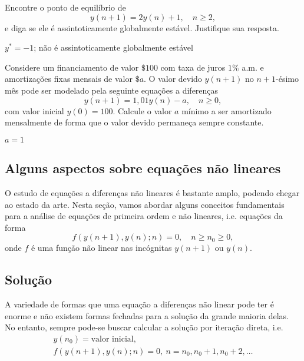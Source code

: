 \begin{exer}
  Encontre o ponto de equilíbrio de
  \begin{equation}
    y(n+1) = 2y(n) + 1,\quad n\geq 2,
  \end{equation}
  e diga se ele é assintoticamente globalmente estável. Justifique sua resposta.
\end{exer}
\begin{resp}
  $y^*=-1$; não é assintoticamente globalmente estável
\end{resp}

\begin{exer}
  Considere um financiamento de valor $\$ 100$ com taxa de juros $1\%$ a.m. e amortizações fixas mensais de valor $\$ a$. O valor devido $y(n+1)$ no $n+1$-ésimo mês pode ser modelado pela seguinte equações a diferenças
  \begin{equation}
    y(n+1) = 1,01y(n)-a,\quad n\geq 0,
  \end{equation}
  com valor inicial $y(0)=100$. Calcule o valor $a$ mínimo a ser amortizado mensalmente de forma que o valor devido permaneça sempre constante.
\end{exer}
\begin{resp}
  $a=1$
\end{resp}

\subsection{Alguns aspectos sobre equações não lineares}

O estudo de equações a diferenças não lineares é bastante amplo, podendo chegar ao estado da arte. Nesta seção, vamos abordar alguns conceitos fundamentais para a análise de equações de primeira ordem e não lineares, i.e. equações da forma
\begin{equation}\label{eq:ead1_enl}
  f\left(y(n+1),y(n);n\right)=0,\quad n\geq n_0\geq 0,
\end{equation}
onde $f$ é uma função não linear nas incógnitas $y(n+1)$ ou $y(n)$.

\subsection{Solução}

A variedade de formas que uma equação a diferenças não linear pode ter é enorme e não existem formas fechadas para a solução da grande maioria delas. No entanto, sempre pode-se buscar calcular a solução por iteração direta, i.e.
\begin{gather}
  y(n_0) = \text{valor inicial},\\
  f\left(y(n+1),y(n);n\right)=0, ~ n= n_0, n_0+1, n_0+2, \ldots
\end{gather}

